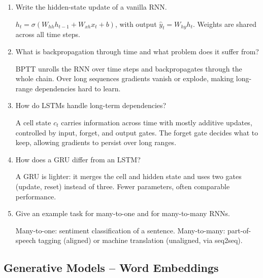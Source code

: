\documentclass[10pt,a4paper]{article}
\newcommand{\q}[1]{\item #1}
\begin{document}
\begin{enumerate}[leftmargin=*,label=\textbf{Q\arabic*.}]

\q Write the hidden-state update of a vanilla RNN.
\begin{answerbox}
$h_t = \sigma(W_{hh}h_{t-1} + W_{xh}x_t + b)$, with output $\hat y_t = W_{hy}h_t$. Weights are shared across all time steps.
\end{answerbox}

\q What is backpropagation through time and what problem does it suffer from?
\begin{answerbox}
BPTT unrolls the RNN over time steps and backpropagates through the whole chain. Over long sequences gradients vanish or explode, making long-range dependencies hard to learn.
\end{answerbox}

\q How do LSTMs handle long-term dependencies?
\begin{answerbox}
A cell state $c_t$ carries information across time with mostly additive updates, controlled by input, forget, and output gates. The forget gate decides what to keep, allowing gradients to persist over long ranges.
\end{answerbox}

\q How does a GRU differ from an LSTM?
\begin{answerbox}
A GRU is lighter: it merges the cell and hidden state and uses two gates (update, reset) instead of three. Fewer parameters, often comparable performance.
\end{answerbox}

\q Give an example task for many-to-one and for many-to-many RNNs.
\begin{answerbox}
Many-to-one: sentiment classification of a sentence. Many-to-many: part-of-speech tagging (aligned) or machine translation (unaligned, via seq2seq).
\end{answerbox}

\end{enumerate}

\subsection{Generative Models -- Word Embeddings}
\end{document}
